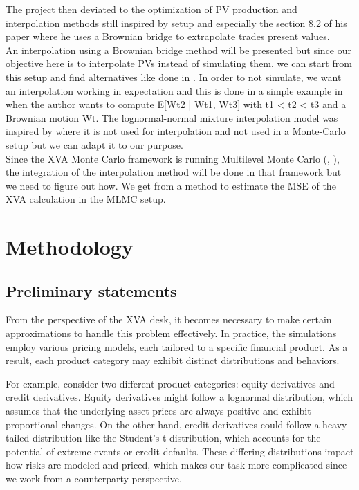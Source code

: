 \documentclass{article}
\begin{document}
The project then deviated to the optimization of PV production and interpolation methods still inspired by \cite{andersen2016rethinking} setup and especially the section 8.2 of his paper where he uses a Brownian bridge to extrapolate trades present values.\\
An interpolation using a Brownian bridge method will be presented but since our objective here is to interpolate PVs instead of simulating them, we can start from this setup and find alternatives like done in \cite{pages2012quizz}. In order to not simulate, we want an interpolation working in expectation and this is done in a simple example in \cite{pages2012quizz} when the author wants to compute E[Wt2 | Wt1, Wt3] with t1 < t2 < t3 and a Brownian motion Wt.
The lognormal-normal mixture interpolation model was inspired by \cite{boinghoff2020alternatives} where it is not used for interpolation and not used in a Monte-Carlo setup but we can adapt it to our purpose.\\
Since the XVA Monte Carlo framework is running Multilevel Monte Carlo (\cite{giles2018multilevel}, \cite{hofer2018accelerating}), the integration of the interpolation method will be done in that framework but we need to figure out how. We get from \cite{internaldoc} a method to estimate the MSE of the XVA calculation in the MLMC setup.

\section{Methodology}

\subsection{Preliminary statements}

From the perspective of the XVA desk, it becomes necessary to make certain approximations to handle this problem effectively. In practice, the simulations employ various pricing models, each tailored to a specific financial product. As a result, each product category may exhibit distinct distributions and behaviors.

For example, consider two different product categories: equity derivatives and credit derivatives. Equity derivatives might follow a lognormal distribution, which assumes that the underlying asset prices are always positive and exhibit proportional changes. On the other hand, credit derivatives could follow a heavy-tailed distribution like the Student's t-distribution, which accounts for the potential of extreme events or credit defaults. These differing distributions impact how risks are modeled and priced, which makes our task more complicated since we work from a counterparty perspective.
\end{document}
